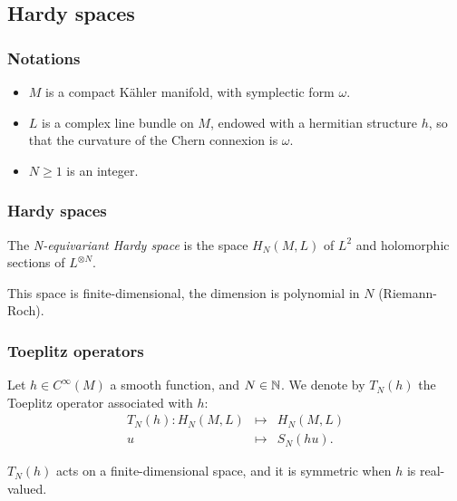 \documentclass[mathserif]{beamer}
\begin{document}
\subsection{Hardy spaces}
\begin{frame}\frametitle{Notations}
	\begin{itemize}
		\item $M$ is a compact K\"ahler manifold, with
                  symplectic form $\omega$.
		\item $L$ is a complex line bundle on $M$, endowed
                  with a hermitian structure $h$, so that the
                  curvature of the Chern connexion is $\omega$.
		\item $N\geq 1$ is an integer.
	\end{itemize}
\end{frame}

\begin{frame}\frametitle{Hardy spaces}
	\begin{defn}
		The \emph{N-equivariant Hardy space} is the space
                $H_N(M,L)$ of $L^2$ and holomorphic sections of $L^{\otimes N}$.
	\end{defn}
	This space is finite-dimensional, the dimension is polynomial
        in $N$ (Riemann-Roch).
	\end{frame}

\begin{frame}\frametitle{Toeplitz operators}
	\begin{defn}
		Let $h\in C^{\infty}(M)$ a smooth function, and $N\in
                \mathbb{N}$. We denote by $T_N(h)$ the Toeplitz operator
                associated with $h$:
		\begin{equation*}
		\begin{array}{rcl}
		T_N(h):H_N(M,L)&\mapsto & H_N(M,L)\\
		u& \mapsto& S_N(hu).
		\end{array}
		\end{equation*}
	\end{defn}
	$T_N(h)$ acts on a finite-dimensional space, and it is
        symmetric when $h$ is real-valued.

\end{frame}
\end{document}
